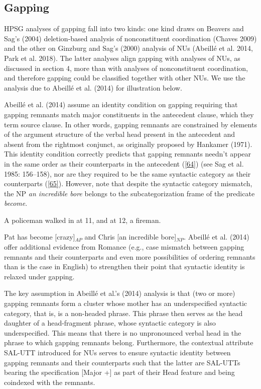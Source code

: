 \documentclass[output=paper]{langsci/langscibook}
\begin{document}
{\subsection{Gapping}
HPSG analyses of gapping fall into two kinds: one kind draws on Beavers and Sag's (2004) deletion-based analysis of nonconstituent coordination (Chaves 2009) and the other on Ginzburg and Sag's (2000) analysis of NUs (Abeill\'{e} et al. 2014, Park et al. 2018). The latter analyses align gapping with analyses of NUs, as discussed in section 4, more than with analyses of nonconstituent coordination, and therefore gapping could be classified together with other NUs. We use the analysis due to Abeill\'{e} et al. (2014) for illustration below.

Abeill\'{e} et al. (2014) assume an identity condition on gapping requiring that gapping remnants match major constituents in the antecedent clause, which they term source clause. In other words, gapping remnants are constrained by elements of the argument structure of the verbal head present in the antecedent and absent from the rightmost conjunct, as originally proposed by Hankamer (1971). This identity condition correctly predicts that gapping remnants needn't appear in the same order as their counterparts in the antecedent (\ref{64}) (see Sag et al. 1985: 156--158), nor are they required to be the same syntactic category as their counterparts (\ref{65}). However, note that despite the syntactic category mismatch, the NP {\it an incredible bore} belongs to the subcategorization frame of the predicate {\it become}.

\ea A policeman walked in at 11, and at 12, a fireman. \label{64}\z

 \ea Pat has become [crazy]$_{AP}$ and Chris [an incredible bore]$_{NP}$.  \label{65}\z
Abeill\'{e} et al. (2014) offer additional evidence from Romance (e.g., case mismatch between gapping remnants and their counterparts and even more possibilities of ordering remnants than is the case in English) to strengthen their point that syntactic identity is relaxed under gapping.


The key assumption in Abeill\'{e} et al.'s (2014) analysis is that (two or more) gapping remnants form a cluster whose mother has an underspecified syntactic category, that is, is a non-headed phrase. This phrase then serves as the head daughter of a head-fragment phrase, whose syntactic category is also underspecified. This means that there is no unpronounced verbal head in the phrase to which gapping remnants belong. Furthermore, the contextual attribute SAL-UTT introduced for NUs serves to ensure syntactic identity between gapping remnants and their counterparts such that the latter are SAL-UTTs bearing the specification [Major +] as part of their Head feature and being coindexed with the remnants.

}
\end{document}
